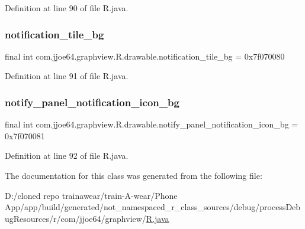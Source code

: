 Definition at line 90 of file R.\+java.

\mbox{\label{classcom_1_1jjoe64_1_1graphview_1_1_r_1_1drawable_a1a7e77810cb6cf6c149d3fd56153c240}} 
\subsubsection{\texorpdfstring{notification\_tile\_bg}{notification\_tile\_bg}}
{\footnotesize\ttfamily final int com.\+jjoe64.\+graphview.\+R.\+drawable.\+notification\+\_\+tile\+\_\+bg = 0x7f070080\hspace{0.3cm}{\ttfamily [static]}}



Definition at line 91 of file R.\+java.

\mbox{\label{classcom_1_1jjoe64_1_1graphview_1_1_r_1_1drawable_a6717bfdb0e1cb8bc4d33a72cf8b68b6e}} 
\subsubsection{\texorpdfstring{notify\_panel\_notification\_icon\_bg}{notify\_panel\_notification\_icon\_bg}}
{\footnotesize\ttfamily final int com.\+jjoe64.\+graphview.\+R.\+drawable.\+notify\+\_\+panel\+\_\+notification\+\_\+icon\+\_\+bg = 0x7f070081\hspace{0.3cm}{\ttfamily [static]}}



Definition at line 92 of file R.\+java.



The documentation for this class was generated from the following file\+:\begin{DoxyCompactItemize}
\item 
D\+:/cloned repo trainawear/train-\/\+A-\/wear/\+Phone App/app/build/generated/not\+\_\+namespaced\+\_\+r\+\_\+class\+\_\+sources/debug/process\+Debug\+Resources/r/com/jjoe64/graphview/\mbox{\hyperlink{process_debug_resources_2r_2com_2jjoe64_2graphview_2_r_8java}{R.\+java}}\end{DoxyCompactItemize}
